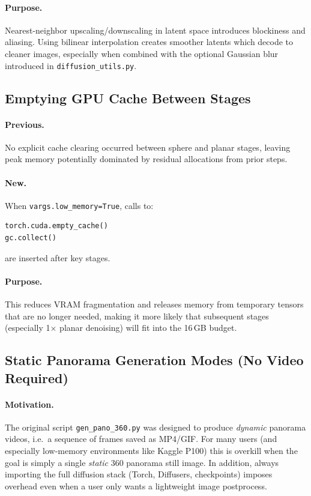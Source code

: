 \documentclass[11pt,a4paper]{article}
\newcommand{\file}[1]{\texttt{#1}}
\newcommand{\fn}[1]{\texttt{#1}}
\begin{document}
\paragraph{Purpose.}
Nearest-neighbor upscaling/downscaling in latent space introduces blockiness and aliasing.
Using bilinear interpolation creates smoother latents which decode to cleaner images, especially when combined with the optional Gaussian blur introduced in \file{diffusion\_utils.py}.

\subsection{Emptying GPU Cache Between Stages}

\paragraph{Previous.}
No explicit cache clearing occurred between sphere and planar stages, leaving peak memory potentially dominated by residual allocations from prior steps.

\paragraph{New.}
When \fn{vargs.low\_memory=True}, calls to:
\begin{lstlisting}
torch.cuda.empty_cache()
gc.collect()
\end{lstlisting}
are inserted after key stages.

\paragraph{Purpose.}
This reduces VRAM fragmentation and releases memory from temporary tensors that are no longer needed,
making it more likely that subsequent stages (especially 1$\times$ planar denoising) will fit into the 16\,GB budget.

\subsection{Static Panorama Generation Modes (No Video Required)}

\paragraph{Motivation.}
The original script \file{gen\_pano\_360.py} was designed to produce \emph{dynamic} panorama videos, i.e.\ a sequence of frames saved as MP4/GIF.
For many users (and especially low-memory environments like Kaggle P100) this is overkill when the goal is simply a single \emph{static} 360 panorama still image.
In addition, always importing the full diffusion stack (Torch, Diffusers, checkpoints) imposes overhead even when a user only wants a lightweight image postprocess.
\end{document}
